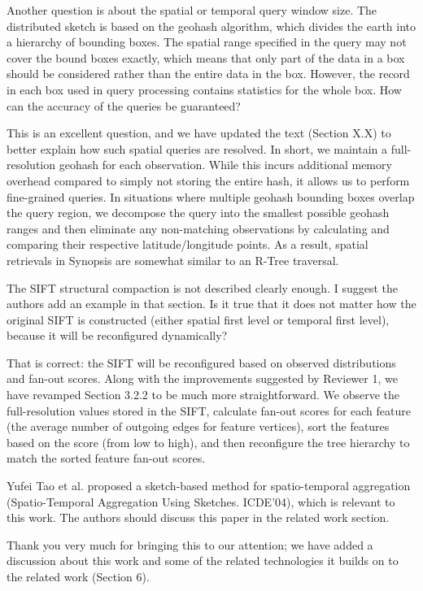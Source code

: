 \documentclass{article}
\begin{document}
Another question is about the spatial or temporal query window size. The
distributed sketch is based on the geohash algorithm, which divides the
earth into a hierarchy of bounding boxes. The spatial range specified in
the query may not cover the bound boxes exactly, which means that only
part of the data in a box should be considered rather than the entire
data in the box. However, the record in each box used in query
processing contains statistics for the whole box. How can the accuracy
of the queries be guaranteed?

\begin{tcolorbox}
This is an excellent question, and we have updated the text (Section X.X) to better explain how such spatial queries are resolved. In short, we maintain a full-resolution geohash for each observation. While this incurs additional memory overhead compared to simply not storing the entire hash, it allows us to perform fine-grained queries. In situations where multiple geohash bounding boxes overlap the query region, we decompose the query into the smallest possible geohash ranges and then eliminate any non-matching observations by calculating and comparing their respective latitude/longitude points. As a result, spatial retrievals in Synopsis are somewhat similar to an R-Tree \cite{guttman1984r} traversal.
\end{tcolorbox}

The SIFT structural compaction is not described clearly enough. I
suggest the authors add an example in that section. Is it true that it
does not matter how the original SIFT is constructed (either spatial
first level or temporal first level), because it will be reconfigured
dynamically?

\begin{tcolorbox}
That is correct: the SIFT will be reconfigured based on observed distributions and fan-out scores. Along with the improvements suggested by Reviewer 1, we have revamped Section 3.2.2 to be much more straightforward. We observe the full-resolution values stored in the SIFT, calculate fan-out scores for each feature (the average number of outgoing edges for feature vertices), sort the features based on the score (from low to high), and then reconfigure the tree hierarchy to match the sorted feature fan-out scores.
\end{tcolorbox}

Yufei Tao et al. proposed a sketch-based method for spatio-temporal
aggregation (Spatio-Temporal Aggregation Using Sketches. ICDE'04), which
is relevant to this work. The authors should discuss this paper in the
related work section.

\begin{tcolorbox}
Thank you very much for bringing this to our attention; we have added a discussion about this work \cite{tao2004spatio} and some of the related technologies it builds on \cite{papadias2002indexing,flajolet1985probabilistic} to the related work (Section 6). 
\end{tcolorbox}



\end{document}
